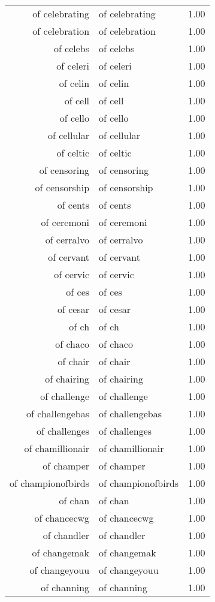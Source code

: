 \begin{table}[ht]
\begin{tabular}{rlr}
  of celebrating & of celebrating & 1.00 \\ 
  of celebration & of celebration & 1.00 \\ 
  of celebs & of celebs & 1.00 \\ 
  of celeri & of celeri & 1.00 \\ 
  of celin & of celin & 1.00 \\ 
  of cell & of cell & 1.00 \\ 
  of cello & of cello & 1.00 \\ 
  of cellular & of cellular & 1.00 \\ 
  of celtic & of celtic & 1.00 \\ 
  of censoring & of censoring & 1.00 \\ 
  of censorship & of censorship & 1.00 \\ 
  of cents & of cents & 1.00 \\ 
  of ceremoni & of ceremoni & 1.00 \\ 
  of cerralvo & of cerralvo & 1.00 \\ 
  of cervant & of cervant & 1.00 \\ 
  of cervic & of cervic & 1.00 \\ 
  of ces & of ces & 1.00 \\ 
  of cesar & of cesar & 1.00 \\ 
  of ch & of ch & 1.00 \\ 
  of chaco & of chaco & 1.00 \\ 
  of chair & of chair & 1.00 \\ 
  of chairing & of chairing & 1.00 \\ 
  of challenge & of challenge & 1.00 \\ 
  of challengebas & of challengebas & 1.00 \\ 
  of challenges & of challenges & 1.00 \\ 
  of chamillionair & of chamillionair & 1.00 \\ 
  of champer & of champer & 1.00 \\ 
  of championofbirds & of championofbirds & 1.00 \\ 
  of chan & of chan & 1.00 \\ 
  of chancecwg & of chancecwg & 1.00 \\ 
  of chandler & of chandler & 1.00 \\ 
  of changemak & of changemak & 1.00 \\ 
  of changeyouu & of changeyouu & 1.00 \\ 
  of channing & of channing & 1.00 \\ 

\end{tabular}
\end{table}
